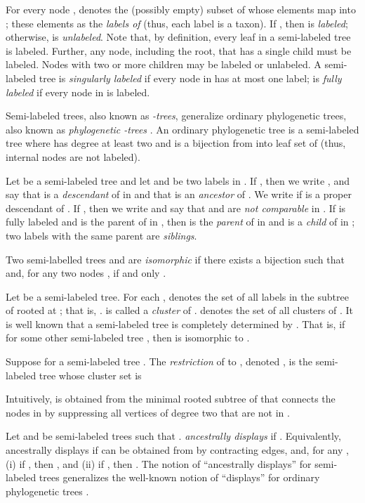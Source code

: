 \documentclass[11pt]{article}
\theoremstyle{definition}
\begin{document}
For every node ,  denotes the (possibly empty) subset of  whose elements map into ; these elements as the \emph{labels of } (thus, each label is a taxon). If , then  is \emph{labeled}; otherwise,  is \emph{unlabeled}.  
Note that, by definition, every leaf in a semi-labeled tree is labeled.  Further, any node, including the root, that has a single child must be labeled.  Nodes with two or more children may be labeled or unlabeled.  A semi-labeled tree  is \emph{singularly labeled} if every node in  has
at most one label;  is \emph{fully labeled} if every node in  is labeled.

Semi-labeled trees, also known as \emph{-trees}, generalize ordinary phylogenetic trees, also known as \emph{phylogenetic -trees} \cite{SempleSteel03}.  An ordinary phylogenetic tree is a semi-labeled tree  where  has degree at least two and  is a bijection from  into leaf set of  (thus, internal nodes are not labeled). 

Let  be a semi-labeled tree and let  and  be two labels in .  
If , then we write , and say that  is a \emph{descendant} of  in  and that  is an \emph{ancestor} of .  We write  if  is a proper descendant of .   If , then we write  and say that  and  are \emph{not comparable} in .  If  is fully labeled and
 is the parent of  in , then  is the \emph{parent} of  in  and  is a \emph{child} of  in ; two labels with the same parent are \emph{siblings}.

Two semi-labelled trees  and  are \emph{isomorphic} if there exists a bijection  such that  and, for any two nodes ,  if and only .



Let   be a semi-labeled tree. For each ,   denotes the set of all labels in the subtree of  rooted at ; that is, .  is called a \emph{cluster} of .  
 denotes the set of all clusters of .   It is well known \cite[Theorem 3.5.2]{SempleSteel03} that a semi-labeled tree  is completely determined by .  That is, if  for some other semi-labeled tree , then  is isomorphic to .



Suppose  for a semi-labeled tree .  The \emph{restriction} of  to , denoted , is the semi-labeled tree whose cluster set is

Intuitively,  is obtained from the minimal rooted subtree of  that connects the nodes in  by suppressing all vertices of degree two that are not in .

Let  and  be semi-labeled trees such that .    \emph{ancestrally displays}  if .  Equivalently,  ancestrally displays  if   can be obtained from  by contracting edges, and, for any , (i) if , then , and
(ii)
if , then .
The notion of ``ancestrally displays'' for semi-labeled trees generalizes the well-known notion of ``displays'' for ordinary phylogenetic trees \cite{SempleSteel03}.  
\end{document}
